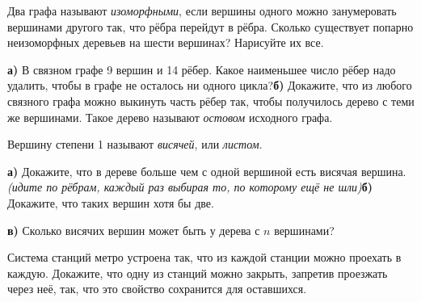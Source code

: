 \documentclass[10pt,a4paper]{article}
\newlength{\shirinaokna}\setlength{\shirinaokna}{12mm}
\newlength{\vysotaokna}\setlength{\vysotaokna}{0.7\baselineskip}
\newcommand{\okno}{\framebox[\shirinaokna]{\rule{0pt}{\vysotaokna}}}
\newlength{\shirinanomera}\setlength{\shirinanomera}{9mm}
\newlength{\zazor}\setlength{\zazor}{0.6em}
\newcommand{\blok}[1]{\par\noindent #1\par}
\newcommand{\nomer}[2]{\makebox[\shirinanomera][l]{%
  \fbox{\rule{0pt}{\vysotaokna}\textbf{#1}$^{#2}$}}}
\newcommand{\term}[1]{\textit{#1}}
\begin{document}
\begin{samepage}
\blok{\nomer{9}{\circ}\hspace{\zazor}\okno\hspace{\zazor}Два графа называют \term{изоморфными}, если вершины одного можно занумеровать вершинами другого так, что рёбра перейдут в рёбра. Сколько существует попарно неизоморфных деревьев на шести вершинах? Нарисуйте их все.}
\end{samepage}\par\vspace{7pt}
\begin{samepage}
\blok{\nomer{10}{\circ}\hspace{\zazor}\okno\hspace{\zazor}\textbf{а)} В связном графе 9 вершин и 14 рёбер. Какое наименьшее число рёбер надо удалить, чтобы в графе не осталось ни одного цикла?\hspace{\zazor}\okno\hspace{\zazor}\textbf{б)} Докажите, что из любого связного графа можно выкинуть часть рёбер так, чтобы получилось дерево с теми же вершинами. Такое дерево называют \term{остовом} исходного графа.}
\end{samepage}\par\vspace{7pt}
\begin{samepage}
\blok{\nomer{11}{\circ}\hspace{\zazor}Вершину степени 1 называют \term{висячей}, или \term{листом}.}
\blok{\okno\hspace{\zazor}\textbf{а)} Докажите, что в дереве больше чем с одной вершиной есть висячая вершина. \textit{(идите по рёбрам, каждый раз выбирая то, по которому ещё не шли)}\hspace{\zazor}\okno\hspace{\zazor}\textbf{б)} Докажите, что таких вершин хотя бы две.}
\blok{\okno\hspace{\zazor}\textbf{в)} Сколько висячих вершин может быть у дерева с $n$ вершинами?}
\end{samepage}\par\vspace{7pt}
\begin{samepage}
\blok{\nomer{12}{\star}\hspace{\zazor}\okno\hspace{\zazor}Система станций метро устроена так, что из каждой станции можно проехать в каждую. Докажите, что одну из станций можно закрыть, запретив проезжать через неё, так, что это свойство сохранится для оставшихся.}
\end{samepage}\par\vspace{7pt}
\end{document}
